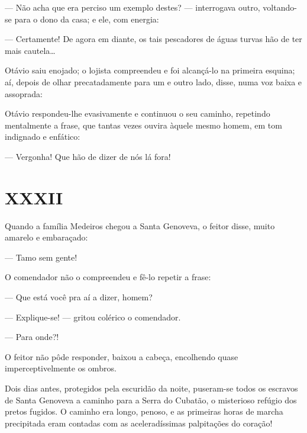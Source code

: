 {--- Não acha que era perciso um exemplo
destes? --- interrogava outro, voltando-se para o dono da
casa; e ele, com energia:

--- Certamente! De agora em diante, os tais pescadores
de águas turvas hão de ter mais cautela\ldots{}

Otávio saiu enojado; o lojista compreendeu e foi
alcançá-lo na primeira esquina; aí, depois de olhar
precatadamente para um e outro lado, disse, numa voz baixa e assoprada:


Otávio respondeu-lhe evasivamente e continuou o seu caminho,
repetindo mentalmente a frase, que tantas vezes ouvira àquele mesmo
homem, em tom indignado e enfático:

--- Vergonha! Que hão de dizer de nós lá fora!


\section{XXXII}


Quando a família Medeiros chegou a Santa Genoveva, o
feitor disse, muito amarelo e embaraçado:

--- Tamo sem gente!

O comendador não o compreendeu e fê-lo repetir a
frase:

--- Que está você pra aí a dizer, homem?


--- Explique-se! --- gritou colérico o comendador.


--- Para onde?!

O feitor não pôde responder, baixou a cabeça, encolhendo
quase imperceptivelmente os ombros.

Dois dias antes, protegidos pela escuridão da noite,
puseram-se todos os escravos de Santa Genoveva a caminho para a
Serra do Cubatão, o misterioso refúgio dos pretos fugidos. O caminho era
longo, penoso, e as primeiras horas de marcha precipitada eram contadas
com as aceleradíssimas palpitações do coração!

}
